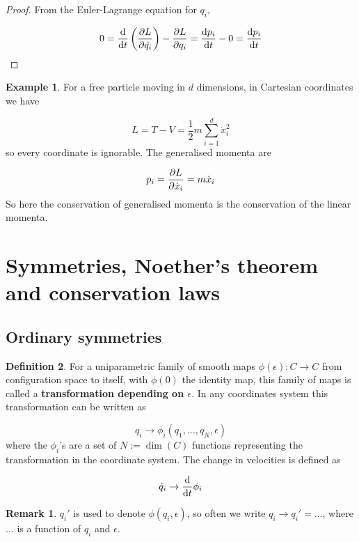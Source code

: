 \documentclass[12pt,a4paper]{article}
\theoremstyle{definition}
\newtheorem{definition}{Definition}[subsection]
\newtheorem{example}[definition]{Example}
\newtheorem*{remark}{Remark}
\begin{document}
\begin{proof}
	From the Euler-Lagrange equation for $q_i$,

	\[ 0 = \diff{}{t} \left( \diffp{L}{\dot{q_i}} \right) - \diffp{L}{q_i} = \diff{p_i}{t} - 0 = \diff{p_i}{t} \]
\end{proof}

\begin{example}
	For a free particle moving in $d$ dimensions, in Cartesian coordinates we have

	\[ L = T - V = \frac{1}{2} m \sum_{i = 1}^d \dot{x}_i^2 \]
	so every coordinate is ignorable. The generalised momenta are

	\[ p_i = \diffp{L}{\dot{x}_i} = m \dot{x}_i \]
	So here the conservation of generalised momenta is the conservation of the linear momenta.
\end{example}

\section{Symmetries, Noether's theorem and conservation laws}

\subsection{Ordinary symmetries}

\begin{definition}
	For a uniparametric family of smooth maps $\phi(\epsilon): C \rightarrow C$ from configuration space to itself, with $\phi(0)$ the identity map, this family of maps is called a \textbf{transformation depending on $\epsilon$}. In any coordinates system this transformation can be written as

	\[ q_i \rightarrow \phi_i(q_1, \dots, q_N, \epsilon) \]
	where the $\phi_i$'s are a set of $N := \dim(C)$ functions representing the transformation in the coordinate system. The change in velocities is defined as

	\[ \dot{q}_i \rightarrow \diff{}{t} \phi_i \]
\end{definition}

\begin{remark}
	$q_i'$ is used to denote $\phi(q_i, \epsilon)$, so often we write $q_i \rightarrow q_i' = \dots$, where $\dots$ is a function of $q_i$ and $\epsilon$.
\end{remark}
\end{document}
